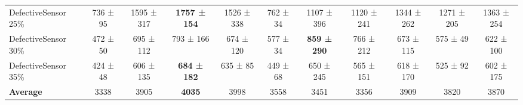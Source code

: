 \begin{tabular}{l|c|ccc|ccc|ccc}
DefectiveSensor 25\% &736 ± 95 &1595 ± 317 &\textbf{1757 ± 154} &1526 ± 338 &762 ± 34 &1107 ± 396 &1120 ± 241 &1344 ± 262 &1271 ± 205 &1363 ± 254 \\
DefectiveSensor 30\% &472 ± 50 &695 ± 112 &793 ± 166 &674 ± 120 &577 ± 34 &\textbf{859 ± 290} &766 ± 212 &673 ± 115 &575 ± 49 &622 ± 100 \\
DefectiveSensor 35\% &424 ± 48 &606 ± 135 &\textbf{684 ± 182} &635 ± 85 &449 ± 68 &650 ± 245 &565 ± 151 &618 ± 170 &525 ± 92 &602 ± 175 \\
\bottomrule
\textbf{Average} &3338 &3905 &\textbf{4035} &3998 &3558 &3451 &3356 &3909 &3820 &3870 \\
\bottomrule
\end{tabular}